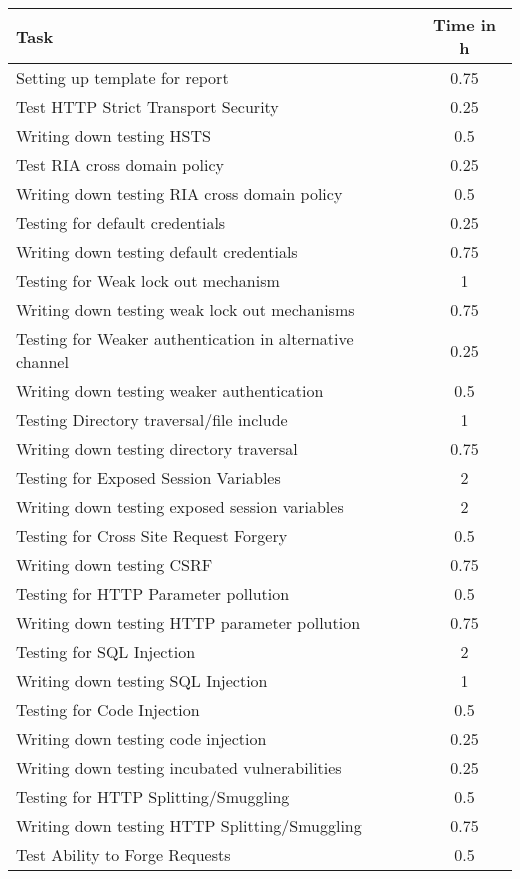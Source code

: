 \begin{table}[H]
\tiny
\begin{tabular*}{\textwidth}{@{\extracolsep{\fill}} l c@{\extracolsep{0pt}} }
\textbf{Task} & \textbf{Time in h} \\ \hline
Setting up template for report				& 0.75 \\
Test HTTP Strict Transport Security 		& 0.25 \\
Writing down testing HSTS					& 0.5 \\
Test RIA cross domain policy 				& 0.25 \\
Writing down testing RIA cross domain policy & 0.5 \\
Testing for default credentials 			& 0.25 \\
Writing down testing default credentials 	& 0.75 \\
Testing for Weak lock out mechanism 		& 1 \\
Writing down testing weak lock out mechanisms & 0.75 \\
Testing for Weaker authentication in alternative channel & 0.25 \\
Writing down testing weaker authentication 	& 0.5 \\
Testing Directory traversal/file include	& 1 \\
Writing down testing directory traversal	& 0.75 \\
Testing for Exposed Session Variables		& 2 \\
Writing down testing exposed session variables & 2 \\
Testing for Cross Site Request Forgery		& 0.5 \\
Writing down testing CSRF					& 0.75 \\
Testing for HTTP Parameter pollution		& 0.5 \\
Writing down testing HTTP parameter pollution & 0.75 \\
Testing for SQL Injection					& 2 \\
Writing down testing SQL Injection 			& 1 \\
Testing for Code Injection					& 0.5 \\
Writing down testing code injection 		& 0.25 \\
Writing down testing incubated vulnerabilities & 0.25 \\
Testing for HTTP Splitting/Smuggling		& 0.5 \\
Writing down testing HTTP Splitting/Smuggling & 0.75 \\
Test Ability to Forge Requests				& 0.5 \\

\end{tabular*}
\end{table}
